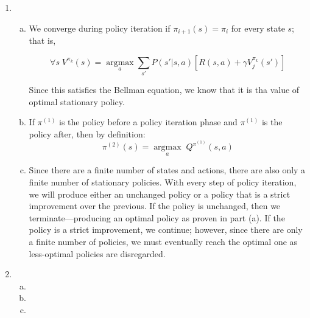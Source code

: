 \documentclass{article}
\begin{document}
\begin{enumerate}
\begin{enumerate}[(a)]
                \item %
                \item %
            \end{enumerate}        
        \item
            \begin{enumerate}[(a)]
                \item We converge during policy iteration if $\pi_{i+1}(s) = \pi_{i}$ for every state $s$; that is, 

                $$\forall s \; V^{\pi_k}(s) = \underset{a}{\operatorname{argmax}} \sum_{s'} P(s' | s, a) [R(s, a) + \gamma V_j^{\pi_k}(s')]$$

                Since this satisfies the Bellman equation, we know that it is tha value of optimal stationary policy.
                \item If $\pi^{(1)}$ is the policy before a policy iteration phase and $\pi^{(1)}$ is the policy after, then by definition: $$\pi^{(2)}(s) = \underset{a}{\operatorname{argmax}} \; Q^{\pi^{(1)}}(s, a)$$

                
                \item Since there are a finite number of states and actions, there are also only a finite number of stationary policies. With every step of policy iteration, we will produce either an unchanged policy or a policy that is a strict improvement over the previous. If the policy is unchanged, then we terminate---producing an optimal policy as proven in part (a). If the policy is a strict improvement, we continue; however, since there are only a finite number of policies, we must eventually reach the optimal one as less-optimal policies are disregarded.
            \end{enumerate}        
        \item
            \begin{enumerate}[(a)]
                \item %
                \item %
                \item %
            \end{enumerate}                
    \end{enumerate}
\end{document}
